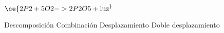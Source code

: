 $\ce{2P2 + 5O2 ->2P2O5 + \text{luz} ^}$

\begin{choices}
    \choice Descomposición
    \CorrectChoice Combinación
    \choice Desplazamiento
    \choice Doble desplazamiento
\end{choices}
